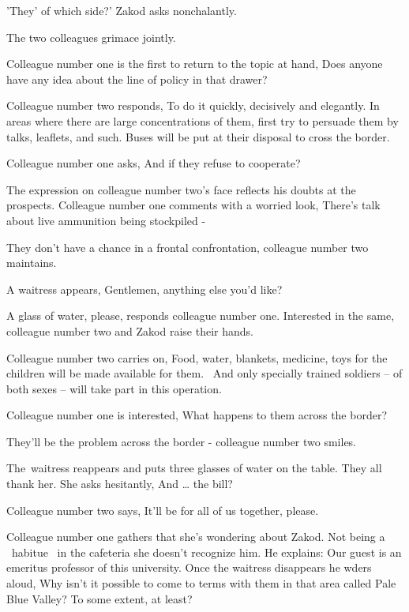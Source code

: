 \documentclass[letterpaper]{article}
\begin{document}
{\textquotedbl}'They' of which side?{\textquotedbl}' Zakod asks nonchalantly.

The two colleagues grimace jointly. 

Colleague number one is the first to return to the topic at hand, {\textquotedbl}Does anyone have any idea about the
line of policy in that drawer?{\textquotedbl} 

Colleague number two responds, {\textquotedbl}To do it quickly, decisively and elegantly. In areas where there are large
concentrations of them, first try to persuade them by talks, leaflets, and such. Buses will be put at their disposal to
cross the border.{\textquotedbl} 

Colleague number one asks, {\textquotedbl}And if they refuse to cooperate?{\textquotedbl} 

The expression on colleague number two's face reflects his doubts at the prospects. Colleague number one comments with a
worried look, {\textquotedbl}There's talk about live ammunition being stockpiled -{\textquotedbl}~ 

{\textquotedbl}They don't have a chance in a frontal confrontation,{\textquotedbl} colleague number two maintains.

A waitress appears, {\textquotedbl}Gentlemen, anything else you'd like?{\textquotedbl} 

{\textquotedbl}A glass of water, please,{\textquotedbl} responds colleague number one. Interested in the same, colleague
number two and Zakod raise their hands. 

Colleague number two carries on, {\textquotedbl}Food, water, blankets, medicine, toys for the children will be made
available for them. ~And only specially trained soldiers -- of both sexes -- will take part in this
operation.{\textquotedbl} 

Colleague number one is interested, {\textquotedbl}What happens to them across the border?{\textquotedbl} 

{\textquotedbl}They'll be the problem across the border -{\textquotedbl} colleague number two smiles.

The~waitress reappears and puts three glasses of water on the table. They all thank her. She asks hesitantly,
{\textquotedbl}And {\dots} the bill?{\textquotedbl} 

Colleague number two says, {\textquotedbl}It'll be for all of us together, please.{\textquotedbl} 

Colleague number one gathers that she's wondering about Zakod. Not being a \ habitue \ in the cafeteria she doesn't
recognize him. He explains: {\textquotedbl}Our guest is an emeritus professor of this university.{\textquotedbl} Once
the waitress disappears he wders aloud, {\textquotedbl}Why isn't it possible to come to terms with them in that area
called Pale Blue Valley? To some extent, at least?{\textquotedbl} 
\end{document}
